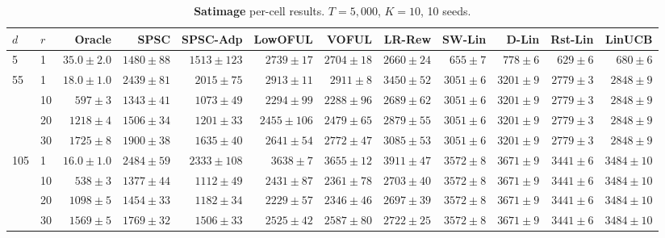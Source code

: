 \begin{table}[!htbp]
\centering
\caption{\textbf{Satimage} per-cell results. $T{=}5{,}000$, $K{=}10$, 10 seeds.}
\label{tab:app-satimage}
\scriptsize
\setlength{\tabcolsep}{3pt}
\begin{tabular}{llrrrrrrrrrr}
\toprule
$d$ & $r$ & Oracle & \textbf{SPSC} & \textbf{SPSC-Adp} & LowOFUL & VOFUL & LR-Rew & SW-Lin & D-Lin & Rst-Lin & LinUCB \\
\midrule
5 & 1 & $35.0{\pm}2.0$ & $1480{\pm}88$ & $1513{\pm}123$ & $2739{\pm}17$ & $2704{\pm}18$ & $2660{\pm}24$ & $655{\pm}7$ & $778{\pm}6$ & \underline{$629{\pm}6$} & $680{\pm}6$ \\
55 & 1 & $18.0{\pm}1.0$ & \cellcolor{green!12}$2439{\pm}81$ & \cellcolor{green!12}$2015{\pm}75$ & $2913{\pm}11$ & $2911{\pm}8$ & $3450{\pm}52$ & $3051{\pm}6$ & $3201{\pm}9$ & \underline{$2779{\pm}3$} & $2848{\pm}9$ \\
 & 10 & $597{\pm}3$ & \cellcolor{green!12}$1343{\pm}41$ & \cellcolor{green!12}$1073{\pm}49$ & $2294{\pm}99$ & \underline{$2288{\pm}96$} & $2689{\pm}62$ & $3051{\pm}6$ & $3201{\pm}9$ & $2779{\pm}3$ & $2848{\pm}9$ \\
 & 20 & $1218{\pm}4$ & \cellcolor{green!12}$1506{\pm}34$ & \cellcolor{green!12}$1201{\pm}33$ & \underline{$2455{\pm}106$} & $2479{\pm}65$ & $2879{\pm}55$ & $3051{\pm}6$ & $3201{\pm}9$ & $2779{\pm}3$ & $2848{\pm}9$ \\
 & 30 & $1725{\pm}8$ & \cellcolor{green!12}$1900{\pm}38$ & \cellcolor{green!12}$1635{\pm}40$ & \underline{$2641{\pm}54$} & $2772{\pm}47$ & $3085{\pm}53$ & $3051{\pm}6$ & $3201{\pm}9$ & $2779{\pm}3$ & $2848{\pm}9$ \\
105 & 1 & $16.0{\pm}1.0$ & \cellcolor{green!12}$2484{\pm}59$ & \cellcolor{green!12}$2333{\pm}108$ & $3638{\pm}7$ & $3655{\pm}12$ & $3911{\pm}47$ & $3572{\pm}8$ & $3671{\pm}9$ & \underline{$3441{\pm}6$} & $3484{\pm}10$ \\
 & 10 & $538{\pm}3$ & \cellcolor{green!12}$1377{\pm}44$ & \cellcolor{green!12}$1112{\pm}49$ & $2431{\pm}87$ & \underline{$2361{\pm}78$} & $2703{\pm}40$ & $3572{\pm}8$ & $3671{\pm}9$ & $3441{\pm}6$ & $3484{\pm}10$ \\
 & 20 & $1098{\pm}5$ & \cellcolor{green!12}$1454{\pm}33$ & \cellcolor{green!12}$1182{\pm}34$ & \underline{$2229{\pm}57$} & $2346{\pm}46$ & $2697{\pm}39$ & $3572{\pm}8$ & $3671{\pm}9$ & $3441{\pm}6$ & $3484{\pm}10$ \\
 & 30 & $1569{\pm}5$ & \cellcolor{green!12}$1769{\pm}32$ & \cellcolor{green!12}$1506{\pm}33$ & \underline{$2525{\pm}42$} & $2587{\pm}80$ & $2722{\pm}25$ & $3572{\pm}8$ & $3671{\pm}9$ & $3441{\pm}6$ & $3484{\pm}10$ \\
\bottomrule
\end{tabular}
\end{table}

